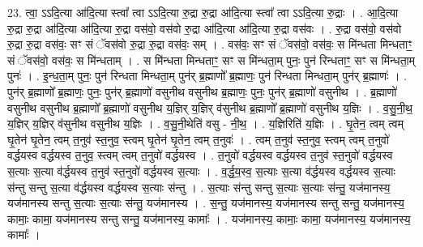 \documentclass[17pt]{extarticle}
\begin{document}
23. त्वा॒ ऽऽदि॒त्या आ॑दि॒त्या स्त्वा᳚ त्वा ऽऽदि॒त्या रु॒द्रा रु॒द्रा आ॑दि॒त्या स्त्वा᳚ त्वा ऽऽदि॒त्या रु॒द्राः । . आ॒दि॒त्या रु॒द्रा रु॒द्रा आ॑दि॒त्या आ॑दि॒त्या रु॒द्रा वस॑वो॒ वस॑वो रु॒द्रा आ॑दि॒त्या आ॑दि॒त्या रु॒द्रा वस॑वः । . रु॒द्रा वस॑वो॒ वस॑वो रु॒द्रा रु॒द्रा वस॑वः॒ सꣳ सं ॅवस॑वो रु॒द्रा रु॒द्रा वस॑वः॒ सम् । . वस॑वः॒ सꣳ सं ॅवस॑वो॒ वस॑वः॒ स मि॑न्धता मिन्धताꣳ॒॒ सं ॅवस॑वो॒ वस॑वः॒ स मि॑न्धताम् । . स मि॑न्धता मिन्धताꣳ॒॒ सꣳ स मि॑न्धता॒म् पुनः॒ पुन॑ रिन्धताꣳ॒॒ सꣳ स मि॑न्धता॒म् पुनः॑ । . इ॒न्ध॒ता॒म् पुनः॒ पुन॑ रिन्धता मिन्धता॒म् पुन॑र् ब्र॒ह्माणो᳚ ब्र॒ह्माणः॒ पुन॑ रिन्धता मिन्धता॒म् पुन॑र् ब्र॒ह्माणः॑ । . पुन॑र् ब्र॒ह्माणो᳚ ब्र॒ह्माणः॒ पुनः॒ पुन॑र् ब्र॒ह्माणो॑ वसुनीथ वसुनीथ ब्र॒ह्माणः॒ पुनः॒ पुन॑र् ब्र॒ह्माणो॑ वसुनीथ । . ब्र॒ह्माणो॑ वसुनीथ वसुनीथ ब्र॒ह्माणो᳚ ब्र॒ह्माणो॑ वसुनीथ य॒ज्ञिर् य॒ज्ञिर् व॑सुनीथ ब्र॒ह्माणो᳚ ब्र॒ह्माणो॑ वसुनीथ य॒ज्ञिः । . व॒सु॒नी॒थ॒ य॒ज्ञिर् य॒ज्ञिर् व॑सुनीथ वसुनीथ य॒ज्ञिः । . व॒सु॒नी॒थेति॑ वसु - नी॒थ॒ । . य॒ज्ञिरिति॑ य॒ज्ञिः । . घृ॒तेन॒ त्वम् त्वम् घृ॒तेन॑ घृ॒तेन॒ त्वम् त॒नुव॑ स्त॒नुव॒ स्त्वम् घृ॒तेन॑ घृ॒तेन॒ त्वम् त॒नुवः॑ । . त्वम् त॒नुव॑ स्त॒नुव॒ स्त्वम् त्वम् त॒नुवो॑ वर्द्धयस्व वर्द्धयस्व त॒नुव॒ स्त्वम् त्वम् त॒नुवो॑ वर्द्धयस्व । . त॒नुवो॑ वर्द्धयस्व वर्द्धयस्व त॒नुव॑ स्त॒नुवो॑ वर्द्धयस्व स॒त्याः स॒त्या व॑र्द्धयस्व त॒नुव॑ स्त॒नुवो॑ वर्द्धयस्व स॒त्याः । . व॒र्द्ध॒य॒स्व॒ स॒त्याः स॒त्या व॑र्द्धयस्व वर्द्धयस्व स॒त्याः स॑न्तु सन्तु स॒त्या व॑र्द्धयस्व वर्द्धयस्व स॒त्याः स॑न्तु । . स॒त्याः स॑न्तु सन्तु स॒त्याः स॒त्याः स॑न्तु॒ यज॑मानस्य॒ यज॑मानस्य सन्तु स॒त्याः स॒त्याः स॑न्तु॒ यज॑मानस्य । . स॒न्तु॒ यज॑मानस्य॒ यज॑मानस्य सन्तु सन्तु॒ यज॑मानस्य॒ कामाः॒ कामा॒ यज॑मानस्य सन्तु सन्तु॒ यज॑मानस्य॒ कामाः᳚ । . यज॑मानस्य॒ कामाः॒ कामा॒ यज॑मानस्य॒ यज॑मानस्य॒ कामाः᳚ । \newline
\end{document}
